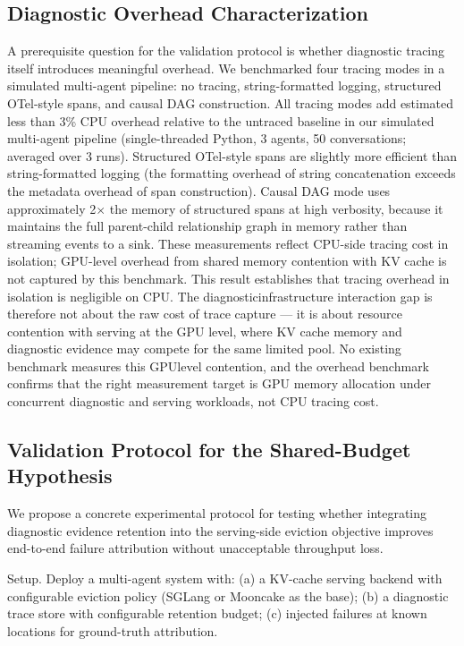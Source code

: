 \documentclass[preprint,12pt]{elsarticle}
\begin{document}
\subsection{Diagnostic Overhead Characterization}
A prerequisite question for the validation protocol is whether diagnostic tracing itself introduces meaningful overhead. We benchmarked four tracing modes in a simulated multi-agent pipeline: no tracing, string-formatted logging, structured OTel-style spans, and causal DAG construction. All tracing modes add estimated less than 3\% CPU overhead relative to the untraced baseline in our simulated multi-agent pipeline (single-threaded Python, 3 agents, 50 conversations; averaged over 3 runs). Structured OTel-style spans are slightly more efficient than string-formatted logging (the formatting overhead of string concatenation exceeds the metadata overhead of span construction). Causal DAG mode uses approximately 2$\times$ the memory of structured spans at high verbosity, because it maintains the full parent-child relationship graph in memory rather than streaming events to a sink. These measurements reflect CPU-side tracing cost in isolation; GPU-level overhead from shared memory contention with KV cache is not captured by this benchmark. This result establishes that tracing overhead in isolation is negligible on CPU. The diagnosticinfrastructure interaction gap is therefore not about the raw cost of trace capture --- it is about resource contention with serving at the GPU level, where KV cache memory and diagnostic evidence may compete for the same limited pool. No existing benchmark measures this GPUlevel contention, and the overhead benchmark confirms that the right measurement target is GPU memory allocation under concurrent diagnostic and serving workloads, not CPU tracing cost.

\subsection{Validation Protocol for the Shared-Budget Hypothesis}
We propose a concrete experimental protocol for testing whether integrating diagnostic evidence retention into the serving-side eviction objective improves end-to-end failure attribution without unacceptable throughput loss.


Setup. Deploy a multi-agent system with: (a) a KV-cache serving backend with configurable eviction policy (SGLang or Mooncake as the base); (b) a diagnostic trace store with configurable retention budget; (c) injected failures at known locations for ground-truth attribution.
\end{document}
